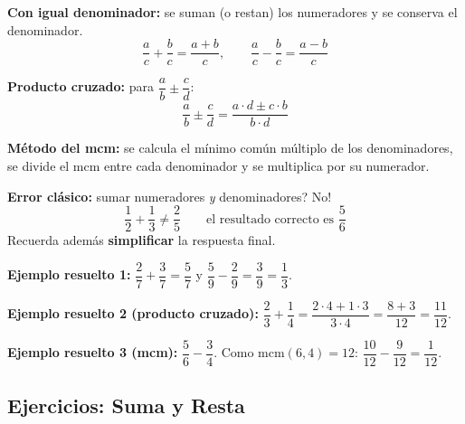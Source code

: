\documentclass[12pt, letterpaper]{article}
\begin{document}
\begin{cuadroteoria}
  \textbf{Con igual denominador:} se suman (o restan) los numeradores y se conserva el denominador.
  \[
    \frac{a}{c} + \frac{b}{c} = \frac{a + b}{c}, \qquad \frac{a}{c} - \frac{b}{c} = \frac{a - b}{c}
  \]

  \textbf{Producto cruzado:} para $\dfrac{a}{b} \pm \dfrac{c}{d}$:
  \[
    \frac{a}{b} \pm \frac{c}{d} = \frac{a \cdot d \pm c \cdot b}{b \cdot d}
  \]

  \textbf{Método del mcm:} se calcula el mínimo común múltiplo de los denominadores, se divide el mcm entre cada denominador y se multiplica por su numerador.
\end{cuadroteoria}

\begin{cuadroadvertencia}
  \textbf{Error clásico:} \textquestiondown sumar numeradores \emph{y} denominadores? \textquestiondown No!
  \[
    \frac{1}{2} + \frac{1}{3} \neq \frac{2}{5} \qquad \text{el resultado correcto es } \frac{5}{6}
  \]
  Recuerda además \textbf{simplificar} la respuesta final.
\end{cuadroadvertencia}

\noindent\textbf{Ejemplo resuelto 1:} $\dfrac{2}{7} + \dfrac{3}{7} = \dfrac{5}{7}$ \qquad y \qquad $\dfrac{5}{9} - \dfrac{2}{9} = \dfrac{3}{9} = \dfrac{1}{3}$.

\noindent\textbf{Ejemplo resuelto 2 (producto cruzado):} $\dfrac{2}{3} + \dfrac{1}{4} = \dfrac{2 \cdot 4 + 1 \cdot 3}{3 \cdot 4} = \dfrac{8 + 3}{12} = \dfrac{11}{12}$.

\noindent\textbf{Ejemplo resuelto 3 (mcm):} $\dfrac{5}{6} - \dfrac{3}{4}$. Como mcm$(6,4) = 12$: $\dfrac{10}{12} - \dfrac{9}{12} = \dfrac{1}{12}$.

\subsection{Ejercicios: Suma y Resta}
\end{document}
